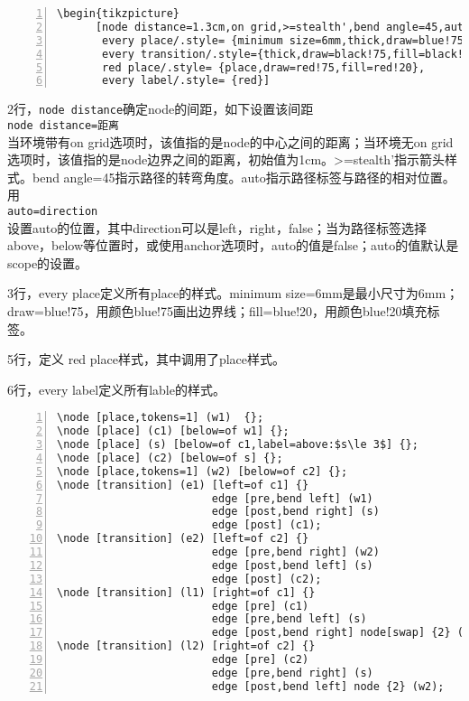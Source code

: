 \documentclass[UTF8]{ctexart}
\begin{document}
\begin{lstlisting}[name=example-2,numbers=left,    numberstyle=\footnotesize]
\begin{tikzpicture}
      [node distance=1.3cm,on grid,>=stealth',bend angle=45,auto,
       every place/.style= {minimum size=6mm,thick,draw=blue!75,fill=blue!20},
       every transition/.style={thick,draw=black!75,fill=black!20},
       red place/.style= {place,draw=red!75,fill=red!20},
       every label/.style= {red}]
\end{lstlisting}

2行，\verb!node distance!确定node的间距，如下设置该间距 \\
\verb!node distance=距离! \\
当环境带有on grid选项时，该值指的是node的中心之间的距离；当环境无on grid选项时，该值指的是node边界之间的距离，初始值为1cm。>=stealth’指示箭头样式。bend angle=45指示路径的转弯角度。auto指示路径标签与路径的相对位置。用 \\
\verb!auto=direction! \\
设置auto的位置，其中direction可以是left，right，false；当为路径标签选择above，below等位置时，或使用anchor选项时，auto的值是false；auto的值默认是scope的设置。

3行，every place定义所有place的样式。minimum size=6mm是最小尺寸为6mm；draw=blue!75，用颜色blue!75画出边界线；fill=blue!20，用颜色blue!20填充标签。

5行，定义 red place样式，其中调用了place样式。

6行，every label定义所有lable的样式。

\begin{lstlisting}[name=example-2,numbers=left,    numberstyle=\footnotesize]
\node [place,tokens=1] (w1)  {};
\node [place] (c1) [below=of w1] {};
\node [place] (s) [below=of c1,label=above:$s\le 3$] {};
\node [place] (c2) [below=of s] {};
\node [place,tokens=1] (w2) [below=of c2] {};
\node [transition] (e1) [left=of c1] {}
                        edge [pre,bend left] (w1)
                        edge [post,bend right] (s)
                        edge [post] (c1);
\node [transition] (e2) [left=of c2] {}
                        edge [pre,bend right] (w2)
                        edge [post,bend left] (s)
                        edge [post] (c2);
\node [transition] (l1) [right=of c1] {}
                        edge [pre] (c1)
                        edge [pre,bend left] (s)
                        edge [post,bend right] node[swap] {2} (w1);
\node [transition] (l2) [right=of c2] {}
                        edge [pre] (c2)
                        edge [pre,bend right] (s)
                        edge [post,bend left] node {2} (w2);
\end{lstlisting}
\end{document}
